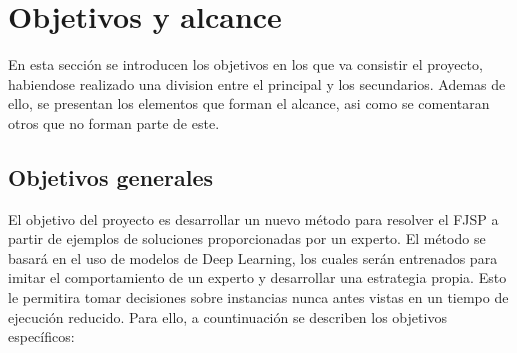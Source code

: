 \section{Objetivos y alcance}
En esta sección se introducen los objetivos en los que va consistir el proyecto, habiendose
realizado una division entre el principal y los secundarios. Ademas de ello, se presentan los elementos
que forman el alcance, asi como se comentaran otros que no forman parte de este.  

\subsection{Objetivos generales}
El objetivo del proyecto es desarrollar un nuevo método para resolver el FJSP 
a partir de ejemplos de soluciones proporcionadas por un experto. El método se basará en
el uso de modelos de Deep Learning, los cuales serán entrenados para imitar el comportamiento
de un experto y desarrollar una estrategia propia. Esto le permitira tomar decisiones 
sobre instancias nunca antes vistas en un tiempo de ejecución reducido. 
Para ello, a countinuación se describen los objetivos específicos:

